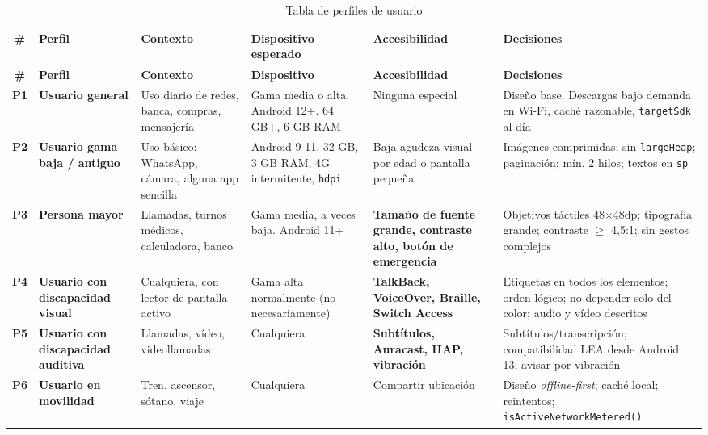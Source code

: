 \documentclass[11pt,a4paper]{article}
\newcommand{\code}[1]{\texttt{\color{ink}#1}}
\begin{document}
	{\footnotesize
		\begin{xltabular}{\textwidth}{@{}c >{\RaggedRight\arraybackslash}p{2.4cm} >{\RaggedRight\arraybackslash}p{2.5cm} >{\RaggedRight\arraybackslash}p{2.7cm} >{\RaggedRight\arraybackslash}p{2.7cm} >{\RaggedRight\arraybackslash}X@{}}
			\caption{Tabla de perfiles de usuario}\label{tab:perfiles}\\
			\toprule
			\textcolor{paper}{\sffamily\bfseries \#} & \textcolor{paper}{\sffamily\bfseries Perfil} & \textcolor{paper}{\sffamily\bfseries Contexto} & \textcolor{paper}{\sffamily\bfseries Dispositivo esperado} & \textcolor{paper}{\sffamily\bfseries Accesibilidad} & \textcolor{paper}{\sffamily\bfseries Decisiones} \\
			\midrule
			\endfirsthead
			\toprule
			\textcolor{paper}{\sffamily\bfseries \#} & \textcolor{paper}{\sffamily\bfseries Perfil} & \textcolor{paper}{\sffamily\bfseries Contexto} & \textcolor{paper}{\sffamily\bfseries Dispositivo} & \textcolor{paper}{\sffamily\bfseries Accesibilidad} & \textcolor{paper}{\sffamily\bfseries Decisiones} \\
			\midrule
			\endhead
			\bottomrule
			\endlastfoot
			\textbf{P1} & \textbf{Usuario general} & Uso diario de redes, banca, compras, mensajería & Gama media o alta. Android 12+. 64 GB+, 6 GB RAM & Ninguna especial & Diseño base. Descargas bajo demanda en Wi-Fi, caché razonable, \code{targetSdk} al día \\
			\textbf{P2} & \textbf{Usuario gama baja / antiguo} & Uso básico: WhatsApp, cámara, alguna app sencilla & Android 9-11. 32 GB, 3 GB RAM, 4G intermitente, \code{hdpi} & Baja agudeza visual por edad o pantalla pequeña & Imágenes comprimidas; sin \code{largeHeap}; paginación; mín. 2 hilos; textos en \code{sp} \\
			\textbf{P3} & \textbf{Persona mayor} & Llamadas, turnos médicos, calculadora, banco & Gama media, a veces baja. Android 11+ & \textbf{Tamaño de fuente grande, contraste alto, botón de emergencia} & Objetivos táctiles 48$\times$48dp; tipografía grande; contraste $\geq$ 4,5:1; sin gestos complejos \\
			\textbf{P4} & \textbf{Usuario con discapacidad visual} & Cualquiera, con lector de pantalla activo & Gama alta normalmente (no necesariamente) & \textbf{TalkBack, VoiceOver, Braille, Switch Access} & Etiquetas en todos los elementos; orden lógico; no depender solo del color; audio y vídeo descritos \\
			\textbf{P5} & \textbf{Usuario con discapacidad auditiva} & Llamadas, vídeo, videollamadas & Cualquiera & \textbf{Subtítulos, Auracast, HAP, vibración} & Subtítulos/transcripción; compatibilidad LEA desde Android 13; avisar por vibración \\
			\textbf{P6} & \textbf{Usuario en movilidad} & Tren, ascensor, sótano, viaje & Cualquiera & Compartir ubicación & Diseño \emph{offline-first}; caché local; reintentos; \code{isActiveNetworkMetered()} \\
		\end{xltabular}
	}
	
\end{document}
